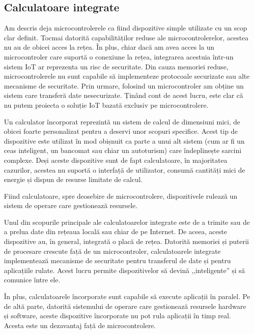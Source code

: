 \subsection{Calculatoare integrate}
\label{sec:embed:micro-comp:embed}

Am descris deja microcontrolerele ca fiind dispozitive simple utilizate cu un scop clar definit.
Tocmai datorită capabilităților reduse ale microcontrolerelor, acestea nu au de obicei acces la rețea.
În plus, chiar dacă am avea acces la un microcontroler care suportă o conexiune la rețea, integrarea acestuia într-un sistem IoT ar reprezenta un risc de securitate.
Din cauza memoriei reduse, microcontrolerele nu sunt capabile să implementeze protocoale securizate sau alte mecanisme de securitate.
Prin urmare, folosind un microcontroler am obține un sistem care transferă date nesecurizate.
Ținând cont de acest lucru, este clar că nu putem proiecta o soluție IoT bazată exclusiv pe microcontrolere.

Un calculator încorporat reprezintă un sistem de calcul de dimensiuni mici, de obicei foarte personalizat pentru a deservi unor scopuri specifice.
Acest tip de dispozitive este utilizat în mod obișnuit ca parte a unui alt sistem (cum ar fi un ceas inteligent, un bancomat sau chiar un autoturism) care îndeplinește sarcini complexe.
Deși aceste dispozitive sunt de fapt calculatoare, în majoritatea cazurilor, acestea nu suportă o interfață de utilizator, consumă cantități mici de energie și dispun de resurse limitate de calcul.

Fiind calculatoare, spre deosebire de microcontrolere, dispozitivele rulează un sistem de operare care gestionează resursele.

Unul din scopurile principale ale calculatoarelor integrate este de a trimite sau de a prelua date din rețeaua locală sau chiar de pe Internet.
De aceea, aceste dispozitive au, în general, integrată o placă de rețea.
Datorită memoriei și puterii de procesare crescute față de un microcontroler, calculatoarele integrate implementează mecanisme de securitate pentru transferul de date și pentru aplicațiile rulate.
Acest lucru permite dispozitivelor să devină ,,inteligente'' și să comunice între ele.

În plus, calculatoarele încorporate sunt capabile să execute aplicații în paralel.
Pe de altă parte, datorită sistemului de operare care gestionează resursele hardware și software, aceste dispozitive încorporate nu pot rula aplicații în timp real.
Acesta este un dezavantaj față de microcontrolere.

